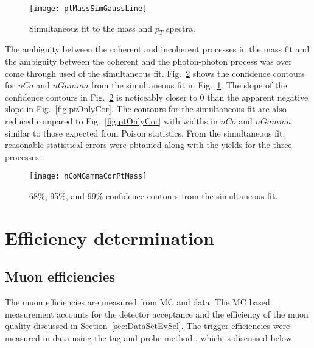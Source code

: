     \begin{figure}[!Hhbt]
      \centering
      \texttt{[image: ptMassSimGaussLine]}
      \caption{Simultaneous fit to the mass and $p_{T}$ spectra.}
      \label{fig:simFitMassPtGauss}
    \end{figure}

    The ambiguity between the coherent and incoherent processes in the mass fit
      and the ambiguity between the coherent and the photon-photon process was 
      over come through used of the simultaneous fit.
    Fig.~\ref{fig:simGaussCor} shows the confidence contours for $nCo$ and 
      $nGamma$ from the simultaneous fit in Fig.~\ref{fig:simFitMassPtGauss}.  
    The slope of the confidence contours in Fig.~\ref{fig:simGaussCor} 
      is noticeably closer to 0 than the apparent negative slope in 
      Fig.~\ref{fig:ptOnlyCor}.
    The contours for the simultaneous fit are also reduced compared to 
      Fig.~\ref{fig:ptOnlyCor} with widths in $nCo$ and $nGamma$ similar to 
      those expected from Poison statistics. 
    From the simultaneous fit, reasonable statistical errors were obtained 
      along with the yields for the three processes. 

    \begin{figure}[!Hhbt]
      \centering
      \texttt{[image: nCoNGammaCorPtMass]}
      \caption{68\%, 95\%, and 99\% confidence contours from the 
        simultaneous fit. }
      \label{fig:simGaussCor}
    \end{figure}

  \section{\label{sec:effDet} Efficiency determination}
    \subsection{Muon efficiencies}
      The muon efficiencies are measured from MC and data.
      The MC based measurement accounts for the detector acceptance and the 
        efficiency of the muon quality discussed in 
        Section~\ref{sec:DataSetEvSel}.
      The trigger efficiencies were measured in data using the tag and probe 
      method \cite{cmsTnP}, which is discussed below. 

